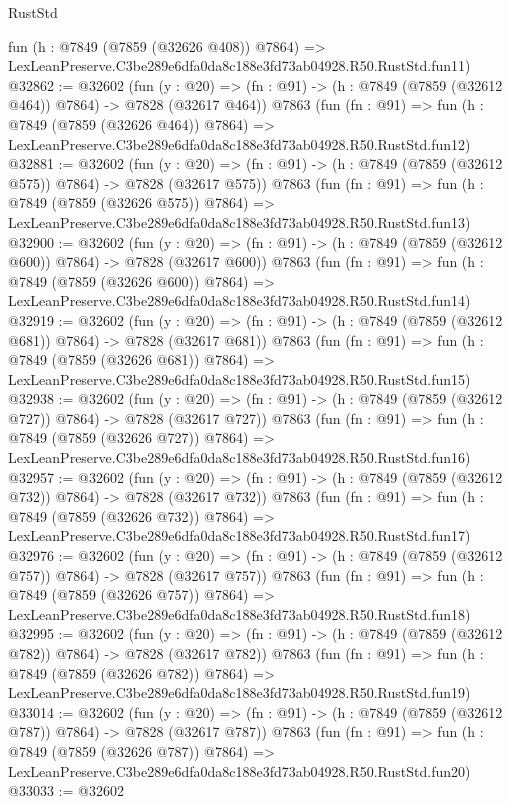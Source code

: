 \begin{lexlean}{RustStd}
\begin{coremodule}
    fun (h : @7849 (@7859 (@32626 @408)) @7864) =>
    LexLeanPreserve.C3be289e6dfa0da8c188e3fd73ab04928.R50.RustStd.fun11)
@32862 := @32602
    (fun (y : @20) => (fn : @91) -> (h : @7849 (@7859 (@32612 @464)) @7864) -> @7828 (@32617 @464))
    @7863
    (fun (fn : @91) =>
    fun (h : @7849 (@7859 (@32626 @464)) @7864) =>
    LexLeanPreserve.C3be289e6dfa0da8c188e3fd73ab04928.R50.RustStd.fun12)
@32881 := @32602
    (fun (y : @20) => (fn : @91) -> (h : @7849 (@7859 (@32612 @575)) @7864) -> @7828 (@32617 @575))
    @7863
    (fun (fn : @91) =>
    fun (h : @7849 (@7859 (@32626 @575)) @7864) =>
    LexLeanPreserve.C3be289e6dfa0da8c188e3fd73ab04928.R50.RustStd.fun13)
@32900 := @32602
    (fun (y : @20) => (fn : @91) -> (h : @7849 (@7859 (@32612 @600)) @7864) -> @7828 (@32617 @600))
    @7863
    (fun (fn : @91) =>
    fun (h : @7849 (@7859 (@32626 @600)) @7864) =>
    LexLeanPreserve.C3be289e6dfa0da8c188e3fd73ab04928.R50.RustStd.fun14)
@32919 := @32602
    (fun (y : @20) => (fn : @91) -> (h : @7849 (@7859 (@32612 @681)) @7864) -> @7828 (@32617 @681))
    @7863
    (fun (fn : @91) =>
    fun (h : @7849 (@7859 (@32626 @681)) @7864) =>
    LexLeanPreserve.C3be289e6dfa0da8c188e3fd73ab04928.R50.RustStd.fun15)
@32938 := @32602
    (fun (y : @20) => (fn : @91) -> (h : @7849 (@7859 (@32612 @727)) @7864) -> @7828 (@32617 @727))
    @7863
    (fun (fn : @91) =>
    fun (h : @7849 (@7859 (@32626 @727)) @7864) =>
    LexLeanPreserve.C3be289e6dfa0da8c188e3fd73ab04928.R50.RustStd.fun16)
@32957 := @32602
    (fun (y : @20) => (fn : @91) -> (h : @7849 (@7859 (@32612 @732)) @7864) -> @7828 (@32617 @732))
    @7863
    (fun (fn : @91) =>
    fun (h : @7849 (@7859 (@32626 @732)) @7864) =>
    LexLeanPreserve.C3be289e6dfa0da8c188e3fd73ab04928.R50.RustStd.fun17)
@32976 := @32602
    (fun (y : @20) => (fn : @91) -> (h : @7849 (@7859 (@32612 @757)) @7864) -> @7828 (@32617 @757))
    @7863
    (fun (fn : @91) =>
    fun (h : @7849 (@7859 (@32626 @757)) @7864) =>
    LexLeanPreserve.C3be289e6dfa0da8c188e3fd73ab04928.R50.RustStd.fun18)
@32995 := @32602
    (fun (y : @20) => (fn : @91) -> (h : @7849 (@7859 (@32612 @782)) @7864) -> @7828 (@32617 @782))
    @7863
    (fun (fn : @91) =>
    fun (h : @7849 (@7859 (@32626 @782)) @7864) =>
    LexLeanPreserve.C3be289e6dfa0da8c188e3fd73ab04928.R50.RustStd.fun19)
@33014 := @32602
    (fun (y : @20) => (fn : @91) -> (h : @7849 (@7859 (@32612 @787)) @7864) -> @7828 (@32617 @787))
    @7863
    (fun (fn : @91) =>
    fun (h : @7849 (@7859 (@32626 @787)) @7864) =>
    LexLeanPreserve.C3be289e6dfa0da8c188e3fd73ab04928.R50.RustStd.fun20)
@33033 := @32602

\end{coremodule}
\end{lexlean}
